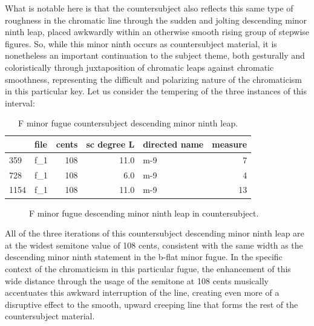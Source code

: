 What is notable here is that the countersubject also reflects this same
type of roughness in the chromatic line through the sudden and jolting
descending minor ninth leap, placed awkwardly within an otherwise smooth
rising group of stepwise figures. So, while this minor ninth occurs as
countersubject material, it is nonetheless an important continuation to
the subject theme, both gesturally and coloristically through
juxtaposition of chromatic leaps against chromatic smoothness,
representing the difficult and polarizing nature of the chromaticism in
this particular key. Let us consider the tempering of the three
instances of this interval:

\begin{singlespace}
\begin{table}[H]
\centering
\tiny
\begin{tabular}{|llrrlr|}
\hline
\textbf{{}} & \textbf{file} & \textbf{ cents} & \textbf{ sc degree L} & \textbf{directed name} & \textbf{ measure }\\
\hline
359  &  f\_1 &    108 &         11.0 &           m-9 &        7 \\
728  &  f\_1 &    108 &          6.0 &           m-9 &        4 \\
1154 &  f\_1 &    108 &         11.0 &           m-9 &       13 \\
\hline
\end{tabular}
\caption{F minor fugue countersubject descending minor ninth leap. }
\end{table}
\normalsize
\end{singlespace}




\begin{figure}[H]
\vspace{1.5em}
    \centering
    \caption{F minor fugue descending minor ninth leap in countersubject. }
\end{figure}    All of the three iterations of this countersubject descending minor
ninth leap are at the widest semitone value of 108 cents, consistent
with the same width as the descending minor ninth statement in the
b-flat minor fugue. In the specific context of the chromaticism in this
particular fugue, the enhancement of this wide distance through the
usage of the semitone at 108 cents musically accentuates this awkward
interruption of the line, creating even more of a disruptive effect to
the smooth, upward creeping line that forms the rest of the
countersubject material.

